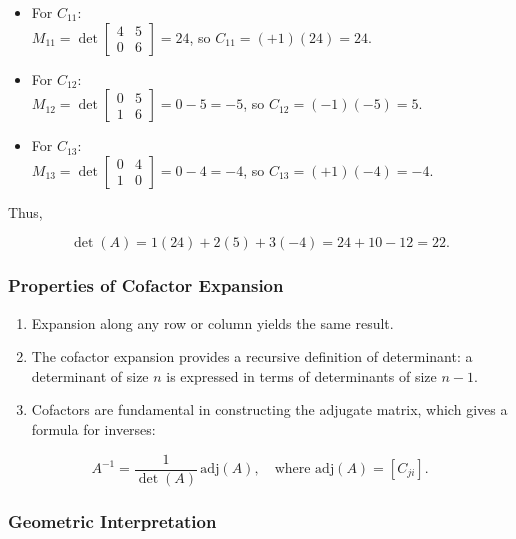 \documentclass[
  12pt,
  a4paper,
]{article}
\begin{document}
\begin{itemize}
\item
  For \(C_{11}\):\\
  \(M_{11} = \det \begin{bmatrix} 4 & 5 \\ 0 & 6 \end{bmatrix} = 24\),
  so \(C_{11} = (+1)(24) = 24\).
\item
  For \(C_{12}\):\\
  \(M_{12} = \det \begin{bmatrix} 0 & 5 \\ 1 & 6 \end{bmatrix} = 0 - 5 = -5\),
  so \(C_{12} = (-1)(-5) = 5\).
\item
  For \(C_{13}\):\\
  \(M_{13} = \det \begin{bmatrix} 0 & 4 \\ 1 & 0 \end{bmatrix} = 0 - 4 = -4\),
  so \(C_{13} = (+1)(-4) = -4\).
\end{itemize}

Thus,

\[\det(A) = 1(24) + 2(5) + 3(-4) = 24 + 10 - 12 = 22.\]

\subsubsection{Properties of Cofactor
Expansion}\label{properties-of-cofactor-expansion}

\begin{enumerate}
\def\labelenumi{\arabic{enumi}.}
\item
  Expansion along any row or column yields the same result.
\item
  The cofactor expansion provides a recursive definition of determinant:
  a determinant of size \(n\) is expressed in terms of determinants of
  size \(n-1\).
\item
  Cofactors are fundamental in constructing the adjugate matrix, which
  gives a formula for inverses:
\end{enumerate}

\[A^{-1} = \frac{1}{\det(A)} \, \text{adj}(A), \quad \text{where adj}(A) = [C_{ji}].\]

\subsubsection{Geometric
Interpretation}\label{geometric-interpretation-12}
\end{document}
